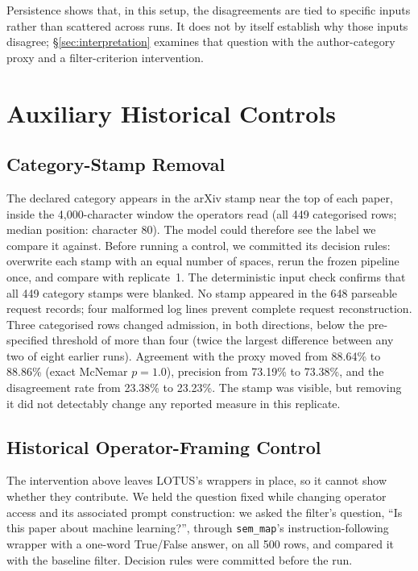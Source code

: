 \documentclass[11pt]{article}
\begin{document}
Persistence shows that, in this setup, the disagreements are tied to specific
inputs rather than scattered across runs. It does not by itself establish
why those inputs disagree; \S\ref{sec:interpretation} examines that question
with the author-category proxy and a filter-criterion intervention.


\section{Auxiliary Historical Controls}
\label{app:controls}

\subsection{Category-Stamp Removal}
\label{app:stamp}
The declared category appears in the arXiv stamp near the top of each paper,
inside the 4{,}000-character window the operators read (all 449 categorised
rows; median position: character 80). The model could therefore see the
label we compare it against. Before running a control, we committed its
decision rules: overwrite each stamp with an equal number of spaces, rerun
the frozen pipeline once, and compare with replicate~1. The deterministic
input check confirms that all 449 category stamps were blanked. No stamp
appeared in the 648 parseable request records; four malformed log lines
prevent complete request reconstruction. Three categorised rows changed admission, in
both directions, below the pre-specified threshold of more than four (twice
the largest difference between any two of eight earlier runs). Agreement with the proxy moved from 88.64\% to 88.86\% (exact McNemar
$p = 1.0$), precision from 73.19\% to 73.38\%, and the disagreement rate from
23.38\% to 23.23\%. The stamp was visible, but removing it did not detectably
change any reported measure in this replicate.

\subsection{Historical Operator-Framing Control}
\label{sec:f14}

The intervention above leaves LOTUS's wrappers in place, so it cannot show
whether they contribute. We held the question fixed while changing operator
access and its associated prompt construction: we asked the filter's question, ``Is this paper about
machine learning?'', through \texttt{sem\_map}'s instruction-following
wrapper with a one-word True/False answer, on all 500 rows, and compared it
with the baseline filter. Decision rules were committed before the run.
\end{document}
